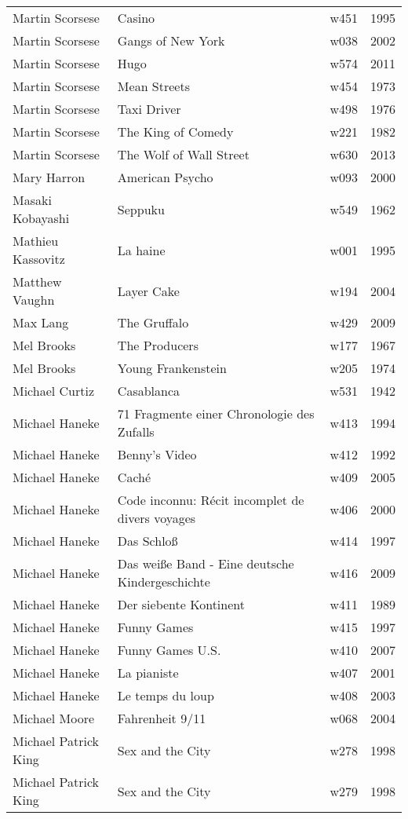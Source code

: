 \documentclass{article}
\begin{document}
\begin {center}
\begin{longtable}{l p{10cm} l l}
Martin Scorsese & Casino & w451 & 1995 \\
Martin Scorsese & Gangs of New York & w038 & 2002 \\
Martin Scorsese & Hugo & w574 & 2011 \\
Martin Scorsese & Mean Streets & w454 & 1973 \\
Martin Scorsese & Taxi Driver & w498 & 1976 \\
Martin Scorsese & The King of Comedy & w221 & 1982 \\
Martin Scorsese & The Wolf of Wall Street & w630 & 2013 \\
Mary Harron & American Psycho & w093 & 2000 \\
Masaki Kobayashi & Seppuku & w549 & 1962 \\
Mathieu Kassovitz & La haine & w001 & 1995 \\
Matthew Vaughn & Layer Cake & w194 & 2004 \\
Max Lang & The Gruffalo & w429 & 2009 \\
Mel Brooks & The Producers & w177 & 1967 \\
Mel Brooks & Young Frankenstein & w205 & 1974 \\
Michael Curtiz & Casablanca & w531 & 1942 \\
Michael Haneke & 71 Fragmente einer Chronologie des Zufalls & w413 & 1994 \\
Michael Haneke & Benny's Video & w412 & 1992 \\
Michael Haneke & Caché & w409 & 2005 \\
Michael Haneke & Code inconnu: Récit incomplet de divers voyages & w406 & 2000 \\
Michael Haneke & Das Schloß & w414 & 1997 \\
Michael Haneke & Das weiße Band - Eine deutsche Kindergeschichte & w416 & 2009 \\
Michael Haneke & Der siebente Kontinent & w411 & 1989 \\
Michael Haneke & Funny Games & w415 & 1997 \\
Michael Haneke & Funny Games U.S. & w410 & 2007 \\
Michael Haneke & La pianiste & w407 & 2001 \\
Michael Haneke & Le temps du loup & w408 & 2003 \\
Michael Moore & Fahrenheit 9/11 & w068 & 2004 \\
Michael Patrick King & Sex and the City & w278 & 1998 \\
Michael Patrick King & Sex and the City & w279 & 1998 \\

\end{longtable}
\end{center}
\end{document}
